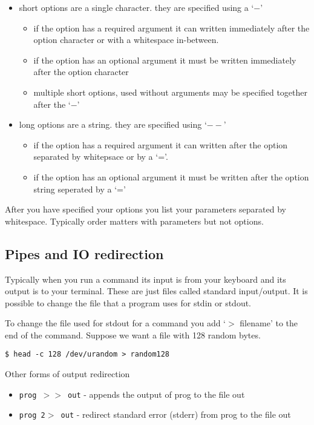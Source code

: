 \documentclass[10pt]{article}
\begin{document}
  \begin{itemize}
  \item 
    short options are a single character. they are specified using a `$-$'
    \begin{itemize}
    \item
      if the option has a required argument it can written immediately after the option character
      or with a whitespace in-between.
    \item
      if the option has an optional argument it must be written 
      immediately after the option character
    \item
      multiple short options, used without arguments may be specified together after the `$-$'
    \end{itemize}
  \item
    long options are a string. they are specified using `$--$'
    \begin{itemize}
    \item
      if the option has a required argument it can written after the option separated by 
      whitepsace or by a `='.
    \item
      if the option has an optional argument it must be written after the option string
      seperated by a `='
    \end{itemize}  
    
  \end{itemize}



  
  After you have specified your options you list your parameters separated by whitespace. Typically order matters with parameters but not options.

  \subsection{Pipes and IO redirection}
  Typically when you run a command its input is from your keyboard and its output is to your terminal.
  These are just files called standard input/output. It is possible to change the file that a program
  uses for stdin or stdout.

  To change the file used for stdout for a command you add `$>$ filename' to the end of the command.
  Suppose we want a file with 128 random bytes.
  
\begin{verbatim}
$ head -c 128 /dev/urandom > random128
\end{verbatim}

  Other forms of output redirection
  \begin{itemize}
    \item \texttt{prog $>>$ out}  
      - appends the output of prog to the file out
    \item \texttt{prog 2$>$ out}  
      - redirect standard error (stderr) from prog to the file out
  \end{itemize}
\end{document}
